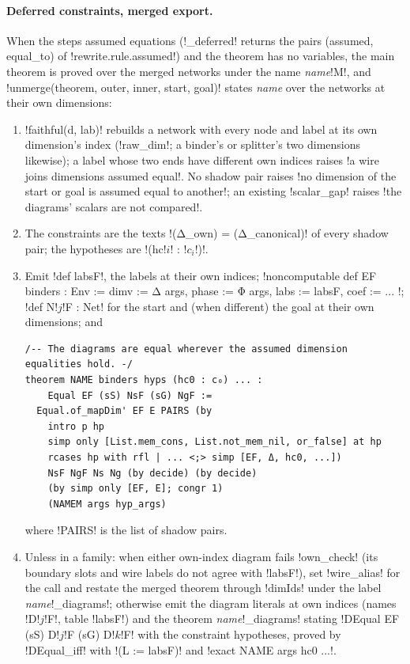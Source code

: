 {\paragraph{Deferred constraints, merged export.} When the steps assumed equations
(\py!_deferred! returns the pairs (assumed, equal\_to) of \py!rewrite.rule.assumed!) and the
theorem has no variables, the main theorem is proved over the merged networks under the name
\textit{name}\code!M!, and \py!unmerge(theorem, outer, inner, start, goal)! states \textit{name}
over the networks at their own dimensions:
\begin{enumerate}
\item \py!faithful(d, lab)! rebuilds a network with every node and label at its own dimension's
  index (\py!raw_dim!; a binder's or splitter's two dimensions likewise); a label whose two ends
  have different own indices raises \code!a wire joins dimensions assumed equal!. No shadow pair
  raises \code!no dimension of the start or goal is assumed equal to another!; an existing
  \py!scalar_gap! raises \code!the diagrams' scalars are not compared!.
\item The constraints are the texts \leanx!(Δ_own) = (Δ_canonical)! of every shadow pair; the
  hypotheses are \code!(hc!$i$\code! : !$c_i$\code!)!.
\item Emit \code!def labsF!, the labels at their own indices;
  \leanx!noncomputable def EF binders : Env := { dimv := Δ args, phase := Φ args, labs := labsF, coef := ... }!;
  \code!def N!$j$\code!F : Net! for the start and (when different) the goal at their own
  dimensions; and
\begin{lstlisting}[style=leannet]
/-- The diagrams are equal wherever the assumed dimension equalities hold. -/
theorem NAME binders hyps (hc0 : c₀) ... :
    Equal EF (sS) NsF (sG) NgF :=
  Equal.of_mapDim' EF E PAIRS (by
    intro p hp
    simp only [List.mem_cons, List.not_mem_nil, or_false] at hp
    rcases hp with rfl | ... <;> simp [EF, Δ, hc0, ...])
    NsF NgF Ns Ng (by decide) (by decide)
    (by simp only [EF, E]; congr 1)
    (NAMEM args hyp_args)
\end{lstlisting}
  where \code!PAIRS! is the list of shadow pairs.
\item Unless in a family: when either own-index diagram fails \py!own_check! (its boundary slots
  and wire labels do not agree with \code!labsF!), set \py!wire_alias! for the call and restate
  the merged theorem through \lean!dimIds! under the label \textit{name}\code!_diagrams!;
  otherwise emit the diagram literals at own indices (names \code!D!$j$\code!F!, table
  \code!labsF!) and the theorem \textit{name}\code!_diagrams! stating
  \code!DEqual EF (sS) D!$j$\code!F (sG) D!$k$\code!F! with the constraint hypotheses, proved by
  \lean!DEqual_iff! with \code!(L := labsF)! and \code!exact NAME args hc0 ...!.
\end{enumerate}

}
